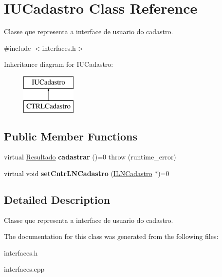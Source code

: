 \hypertarget{classIUCadastro}{}\section{I\+U\+Cadastro Class Reference}
\label{classIUCadastro}


Classe que representa a interface de usuario do cadastro.  




{\ttfamily \#include $<$interfaces.\+h$>$}

Inheritance diagram for I\+U\+Cadastro\+:\begin{figure}[H]
\begin{center}
\leavevmode
\includegraphics[height=2.000000cm]{classIUCadastro}
\end{center}
\end{figure}
\subsection*{Public Member Functions}
\begin{DoxyCompactItemize}
\item 
\mbox{\label{classIUCadastro_af4089cca946d856abae69b931a1dc1e8}} 
virtual \hyperlink{classResultado}{Resultado} {\bfseries cadastrar} ()=0  throw (runtime\+\_\+error)
\item 
\mbox{\label{classIUCadastro_a447c54db4d55910182043c45e3b33e32}} 
virtual void {\bfseries set\+Cntr\+L\+N\+Cadastro} (\hyperlink{classILNCadastro}{I\+L\+N\+Cadastro} $\ast$)=0
\end{DoxyCompactItemize}


\subsection{Detailed Description}
Classe que representa a interface de usuario do cadastro. 

The documentation for this class was generated from the following files\+:\begin{DoxyCompactItemize}
\item 
interfaces.\+h\item 
interfaces.\+cpp\end{DoxyCompactItemize}
